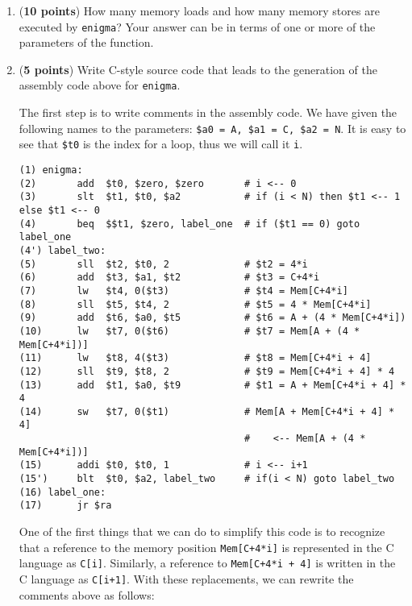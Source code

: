 \documentclass[psfig,11pt]{article}
\newif\ifsol
\begin{document}
\begin{question}[25]
\begin{enumerate}
\item ({\bf 10 points}) How many memory loads and how many memory stores are
  executed by {\tt enigma}? Your answer can be in terms of one or more
  of the parameters of the function.

\ifsol
\color{red}
 There is a loop in {\tt enigma} and each iteration of the loop
  executes 3 loads and 1 store. The loop executes {\tt \$a2} times (we
  called it {\tt N} above). Thus 3 $\times$ {\tt N} loads and {\tt
    N} stores are executed.
\color{black}
\else
\vspace{1in}
\fi

\item ({\bf 5 points}) Write C-style source code that leads to the
  generation of the assembly code above for {\tt enigma}.


\ifsol
\color{red}
The first step is to write comments in the assembly code. We have
  given the following names to the parameters: {\tt \$a0 = A, \$a1 =
    C, \$a2 = N}. It is easy to see that {\tt \$t0} is the index for a loop,
  thus we will call it {\tt i}. 

\begin{verbatim}
(1) enigma:
(2)       add  $t0, $zero, $zero       # i <-- 0
(3)       slt  $t1, $t0, $a2           # if (i < N) then $t1 <-- 1 else $t1 <-- 0
(4)       beq  $$t1, $zero, label_one  # if ($t1 == 0) goto label_one
(4') label_two:
(5)       sll  $t2, $t0, 2             # $t2 = 4*i
(6)       add  $t3, $a1, $t2           # $t3 = C+4*i
(7)       lw   $t4, 0($t3)             # $t4 = Mem[C+4*i]
(8)       sll  $t5, $t4, 2             # $t5 = 4 * Mem[C+4*i]
(9)       add  $t6, $a0, $t5           # $t6 = A + (4 * Mem[C+4*i])
(10)      lw   $t7, 0($t6)             # $t7 = Mem[A + (4 * Mem[C+4*i])]
(11)      lw   $t8, 4($t3)             # $t8 = Mem[C+4*i + 4]
(12)      sll  $t9, $t8, 2             # $t9 = Mem[C+4*i + 4] * 4
(13)      add  $t1, $a0, $t9           # $t1 = A + Mem[C+4*i + 4] * 4
(14)      sw   $t7, 0($t1)             # Mem[A + Mem[C+4*i + 4] * 4] 
                                       #    <-- Mem[A + (4 * Mem[C+4*i])]
(15)      addi $t0, $t0, 1             # i <-- i+1
(15')     blt  $t0, $a2, label_two     # if(i < N) goto label_two
(16) label_one:
(17)      jr $ra
\end{verbatim}

One of the first things that we can do to simplify this code is to
  recognize that a reference to the memory position {\tt Mem[C+4*i]}
  is represented in the C language as {\tt C[i]}. Similarly, a reference to {\tt Mem[C+4*i + 4]} is written in the C language as {\tt C[i+1]}. With these
  replacements, we can rewrite the comments above as follows:
  

\end{enumerate}
\end{question}
\end{document}
